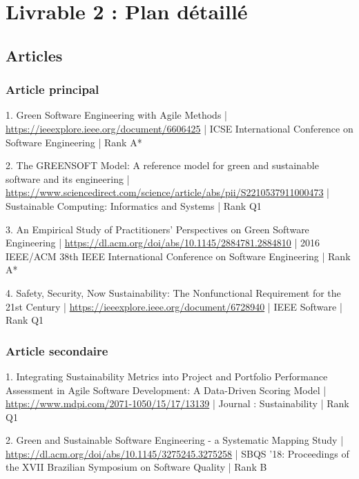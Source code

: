 \section{Livrable 2 : Plan détaillé}

\subsection{Articles}

\subsubsection{Article principal}

1. Green Software Engineering with Agile Methods | \href{https://ieeexplore.ieee.org/document/6606425}{https://ieeexplore.ieee.org/document/6606425} | ICSE International Conference on Software Engineering | Rank A*

2. The GREENSOFT Model: A reference model for green and sustainable software and its engineering | \href{https://www.sciencedirect.com/science/article/abs/pii/S2210537911000473}{https://www.sciencedirect.com/science/article/abs/pii/S2210537911000473} | Sustainable Computing: Informatics and Systems | Rank Q1

3. An Empirical Study of Practitioners' Perspectives on Green Software Engineering | \href{https://dl.acm.org/doi/abs/10.1145/2884781.2884810}{https://dl.acm.org/doi/abs/10.1145/2884781.2884810} | 2016 IEEE/ACM 38th IEEE International Conference on Software Engineering | Rank A*

4. Safety, Security, Now Sustainability: The Nonfunctional Requirement for the 21st Century | \href{https://ieeexplore.ieee.org/document/6728940}{https://ieeexplore.ieee.org/document/6728940} | IEEE Software | Rank Q1

\subsubsection{Article secondaire}

1. Integrating Sustainability Metrics into Project and Portfolio Performance Assessment in Agile Software Development: A Data-Driven Scoring Model | \href{https://www.mdpi.com/2071-1050/15/17/13139}{https://www.mdpi.com/2071-1050/15/17/13139} | Journal : Sustainability | Rank Q1

2. Green and Sustainable Software Engineering - a Systematic Mapping Study | \href{https://dl.acm.org/doi/abs/10.1145/3275245.3275258}{https://dl.acm.org/doi/abs/10.1145/3275245.3275258} | SBQS '18: Proceedings of the XVII Brazilian Symposium on Software Quality | Rank B

